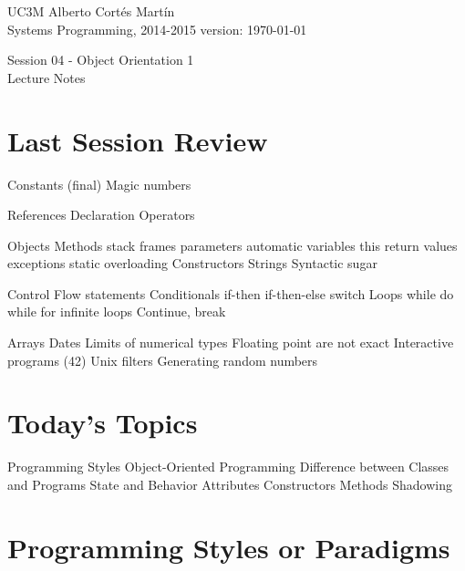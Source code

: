 \documentclass[a4paper, 9pt]{extarticle}
\newcommand{\realtitle}{Session 04 - Object Orientation 1}
\begin{document}
\makebox[\linewidth]{\rule{\textwidth}{0.4pt}}
UC3M \hfill Alberto Cortés Martín\\
Systems Programming, 2014-2015 \hfill version: \today\\
\makebox[\linewidth]{\rule{\textwidth}{0.4pt}}
\begin{center}
  \Large{\realtitle}\\Lecture Notes
\end{center}
\makebox[\linewidth]{\rule{\textwidth}{0.4pt}}
\vspace{1cm}

\section{Last Session Review}

\begin{blackboard}
Constants (final)
  Magic numbers

References
  Declaration
  Operators

Objects
  Methods
    stack frames
    parameters
      automatic variables
      this
    return values
    exceptions
    static
    overloading
  Constructors
  Strings
    Syntactic sugar

Control Flow statements
  Conditionals
    if-then
      if-then-else
    switch
  Loops
    while
    do while
    for
    infinite loops
  Continue, break

Arrays
Dates
Limits of numerical types
Floating point are not exact
Interactive programs (42)
Unix filters
Generating random numbers
\end{blackboard}




\section{Today's Topics}
\begin{blackboard}
Programming Styles
Object-Oriented Programming
Difference between Classes and Programs
State and Behavior
Attributes
Constructors
Methods
Shadowing
\end{blackboard}










\section{Programming Styles or Paradigms}
\end{document}
